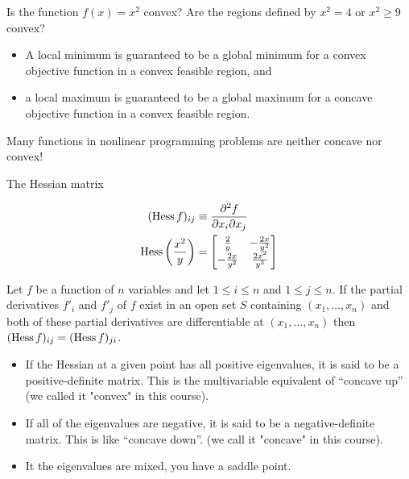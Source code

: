 \documentclass[c]{beamer}
\begin{document}
\begin{frame}[t]{}

  \begin{Exercise}
    Is the function $f(x)=x^2$ convex? Are the regions defined by $x^2=4$ or $x^2\geq 9$ convex?
  \end{Exercise}

\begin{itemize}
    \item A local minimum is guaranteed to be a global minimum for a convex objective function in a convex feasible region, and
    \item a local maximum is guaranteed to be a global maximum for a concave objective function in a convex feasible region.
  \end{itemize}
  Many functions in nonlinear programming problems are neither concave nor convex!
\end{frame}

\begin{frame}[allowframebreaks]{The Hessian matrix}

  \begin{align}
  (\operatorname{Hess} f)_{ij} &\equiv \frac{\partial^{2} f}{\partial x_{i} \partial x_{j} } \\
  \operatorname{Hess}\left( \frac{x^{2}}{y} \right) &=
  \begin{bmatrix}
    \frac{2}{y} & - \frac{2x}{y^{2}} \\
    -\frac{2x}{y^{2}} & \frac{2x^{2}}{y^{3}}
  \end{bmatrix}
\end{align}

Let $f$ be a function of $n$ variables and let $1 \leq i \leq n$ and $1 \leq j \leq n$. If the partial derivatives $f'_i$ and $f'_j$ of $f$ exist in an open set $S$ containing $(x_1,\ldots, x_n)$ and both of these partial derivatives are differentiable at $(x_1, \ldots, x_n)$ then $(\operatorname{Hess} f)_{ij}=(\operatorname{Hess} f)_{ji}$.

\begin{itemize}
  \item If the Hessian at a given point has all positive eigenvalues, it is said to be a positive-definite matrix. This is the multivariable equivalent of “concave up” (we called it "convex" in this course).
  \item If all of the eigenvalues are negative, it is said to be a negative-definite matrix. This is like “concave down”. (we call it "concave" in this course).
  \item It the eigenvalues are mixed, you have a saddle point.
\end{itemize}
\end{frame}
\end{document}
